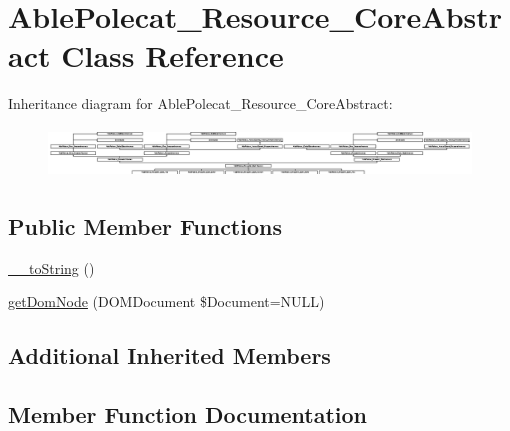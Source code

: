 \hypertarget{class_able_polecat___resource___core_abstract}{}\section{Able\+Polecat\+\_\+\+Resource\+\_\+\+Core\+Abstract Class Reference}
\label{class_able_polecat___resource___core_abstract}
Inheritance diagram for Able\+Polecat\+\_\+\+Resource\+\_\+\+Core\+Abstract\+:\begin{figure}[H]
\begin{center}
\leavevmode
\includegraphics[height=1.327913cm]{class_able_polecat___resource___core_abstract}
\end{center}
\end{figure}
\subsection*{Public Member Functions}
\begin{DoxyCompactItemize}
\item 
\hyperlink{class_able_polecat___resource___core_abstract_a7516ca30af0db3cdbf9a7739b48ce91d}{\+\_\+\+\_\+to\+String} ()
\item 
\hyperlink{class_able_polecat___resource___core_abstract_a3241c66cb1cbb7b720be191808876012}{get\+Dom\+Node} (D\+O\+M\+Document \$Document=N\+U\+L\+L)
\end{DoxyCompactItemize}
\subsection*{Additional Inherited Members}


\subsection{Member Function Documentation}
\hypertarget{class_able_polecat___resource___core_abstract_a7516ca30af0db3cdbf9a7739b48ce91d}{}
